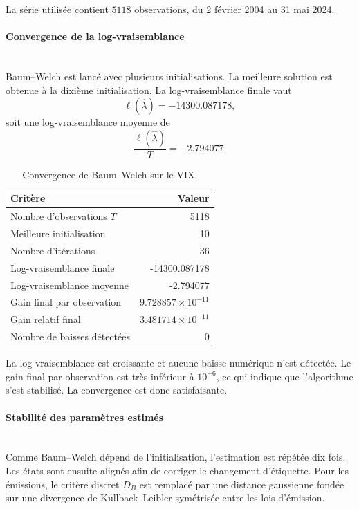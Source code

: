 \documentclass[11pt]{article}
\begin{document}
La série utilisée contient \(5118\) observations, du 2 février 2004 au 31 mai 2024.

\paragraph{Convergence de la log-vraisemblance}\mbox{}\\

Baum--Welch est lancé avec plusieurs initialisations. La meilleure solution est obtenue à la dixième initialisation. La log-vraisemblance finale vaut
\[
\ell(\widehat{\lambda})=-14300.087178,
\]
soit une log-vraisemblance moyenne de
\[
\frac{\ell(\widehat{\lambda})}{T}=-2.794077.
\]

\begin{table}[H]
\centering
\begin{tabular}{lr}
\toprule
Critère & Valeur \\
\midrule
Nombre d'observations \(T\) & 5118 \\
Meilleure initialisation & 10 \\
Nombre d'itérations & 36 \\
Log-vraisemblance finale & -14300.087178 \\
Log-vraisemblance moyenne & -2.794077 \\
Gain final par observation & \(9.728857\times 10^{-11}\) \\
Gain relatif final & \(3.481714\times 10^{-11}\) \\
Nombre de baisses détectées & 0 \\
\bottomrule
\end{tabular}
\caption{Convergence de Baum--Welch sur le VIX.}
\end{table}

La log-vraisemblance est croissante et aucune baisse numérique n'est détectée. Le gain final par observation est très inférieur à \(10^{-6}\), ce qui indique que l'algorithme s'est stabilisé. La convergence est donc satisfaisante.

\paragraph{Stabilité des paramètres estimés}\mbox{}\\

Comme Baum--Welch dépend de l'initialisation, l'estimation est répétée dix fois. Les états sont ensuite alignés afin de corriger le changement d'étiquette. Pour les émissions, le critère discret \(D_B\) est remplacé par une distance gaussienne fondée sur une divergence de Kullback--Leibler symétrisée entre les lois d'émission.
\end{document}
